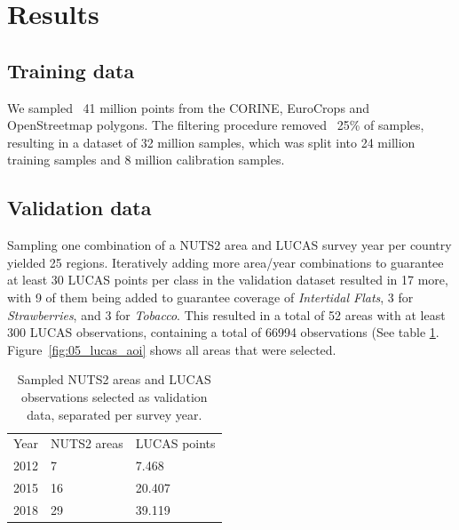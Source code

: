 \section{Results}
    \subsection{Training data}

        We sampled ~41 million points from the CORINE, EuroCrops and OpenStreetmap polygons. The filtering procedure removed ~25\% of samples, resulting in a dataset of 32 million samples, which was split into 24 million training samples and 8 million calibration samples.
    
\subsection{Validation data}

    Sampling one combination of a NUTS2 area and LUCAS survey year per country yielded 25 regions. Iteratively adding more area/year combinations to guarantee at least 30 LUCAS points per class in the validation dataset resulted in 17 more, with 9 of them being added to guarantee coverage of \textit{Intertidal Flats}, 3 for \textit{Strawberries}, and 3 for \textit{Tobacco}. This resulted in a total of 52 areas with at least 300 LUCAS observations, containing a total of 66994 observations (See table \ref{tab:05_lucas_nuts}. Figure~\ref{fig:05_lucas_aoi} shows all areas that were selected.

    \begin{table}[]
    \begin{tabular}{lll}
    Year & NUTS2 areas & LUCAS points \\
    2012 & 7           & 7.468        \\
    2015 & 16          & 20.407       \\
    2018 & 29          & 39.119      
    \end{tabular}
    \caption{Sampled NUTS2 areas and LUCAS observations selected as validation data, separated per survey year.}
    \label{tab:05_lucas_nuts}
    \end{table}
    
